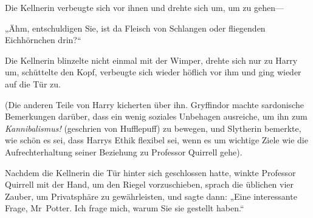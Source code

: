 Die Kellnerin verbeugte sich vor ihnen und drehte sich um, um zu gehen—

„Ähm, entschuldigen Sie, ist da Fleisch von Schlangen oder fliegenden Eichhörnchen drin?“

Die Kellnerin blinzelte nicht einmal mit der Wimper, drehte sich nur zu Harry um, schüttelte den Kopf, verbeugte sich wieder höflich vor ihm und ging wieder auf die Tür zu.

(Die anderen Teile von Harry kicherten über ihn. Gryffindor machte sardonische Bemerkungen darüber, dass ein wenig soziales Unbehagen ausreiche, um ihn zum \emph{Kannibalismus!} (geschrien von Hufflepuff) zu bewegen, und Slytherin bemerkte, wie schön es sei, dass Harrys Ethik flexibel sei, wenn es um wichtige Ziele wie die Aufrechterhaltung seiner Beziehung zu Professor Quirrell gehe).

Nachdem die Kellnerin die Tür hinter sich geschlossen hatte, winkte Professor Quirrell mit der Hand, um den Riegel vorzuschieben, sprach die üblichen vier Zauber, um Privatsphäre zu gewährleisten, und sagte dann: „Eine interessante Frage, Mr~Potter. Ich frage mich, warum Sie sie gestellt haben.“

